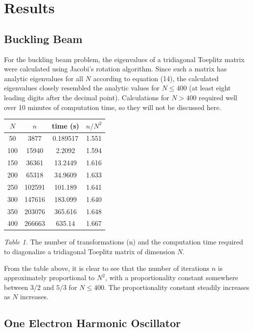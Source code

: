 \documentclass[prb,aps,twocolumn,showpacs,10pt]{revtex4-1}
\begin{document}
\section{Results}

\subsection{Buckling Beam}

For the buckling beam problem, the eigenvalues of a tridiagonal Toeplitz matrix were calculated using Jacobi's rotation algorithm. Since such a matrix has analytic eigenvalues for all $N$ according to equation (14), the calculated eigenvalues closely resembled the analytic values for $N\leq 400$ (at least eight leading digits after the decimal point). Calculations for $N>400$ required well over 10 minutes of computation time, so they will not be discussed here. 
\begin{center}
\begin{tabular}{|c|c|c|c|}
\hline
$N$ & $n$ & time (s) & $n/N^2$ \\
\hline
\hline
50 & 3877 & 0.189517  &1.551\\
\hline
100 & 15940 & 2.2092& 1.594\\
\hline
150 & 36361 & 13.2449&1.616\\
\hline
200 & 65318 & 34.9609&1.633\\
\hline
250 & 102591 & 101.189&1.641\\
\hline
300 & 147616 & 183.099&1.640\\
\hline
350 & 203076 & 365.616 & 1.648\\
\hline
400 & 266663 & 635.14& 1.667\\
\hline
\end{tabular}

\vspace*{3mm}
\textit{Table 1.} The number of transformations (n) and the computation time required to diagonalize a tridiagonal Toeplitz matrix of dimension $N$.
\end{center}

From the table above, it is clear to see that the number of iterations $n$ is approximately proportional to $N^2$, with a proportionality constant somewhere between $3/2$ and $5/3$ for $N \leq 400$. The proportionality constant steadily increases as $N$ increases.

\subsection{One Electron Harmonic Oscillator}
\end{document}

